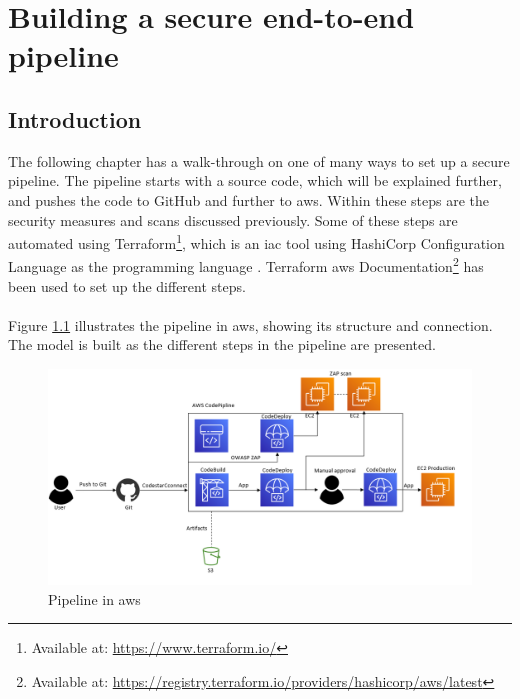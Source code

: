\newpage
\thispagestyle{empty}
\mbox{}

\chapter{Building a secure end-to-end pipeline}
\label{Deployment}
\section{Introduction}
The following chapter has a walk-through on one of many ways to set up a secure pipeline. The pipeline starts with a source code, which will be explained further, and pushes the code to GitHub and further to \acrshort{aws}. Within these steps are the security measures and scans discussed previously. Some of these steps are automated using Terraform\footnote{Available at: \url{https://www.terraform.io/}}, which is an \gls{iac} tool using HashiCorp Configuration Language as the programming language \cite{hcl}. Terraform \acrshort{aws} Documentation\footnote{Available at: \url{https://registry.terraform.io/providers/hashicorp/aws/latest}} has been used to set up the different steps.
\\~\\
Figure \ref{fig: Pipeline in AWS} illustrates the pipeline in \acrshort{aws}, showing its structure and connection. The model is built as the different steps in the \gls{pipeline} are presented.

\vspace{2mm}
\begin{figure}[H]
    \centering
    \includegraphics[width=1\columnwidth]{Images/aws-piplin-7.png}
    \caption{Pipeline in \acrshort{aws}}
    \label{fig: Pipeline in AWS}
\end{figure}

